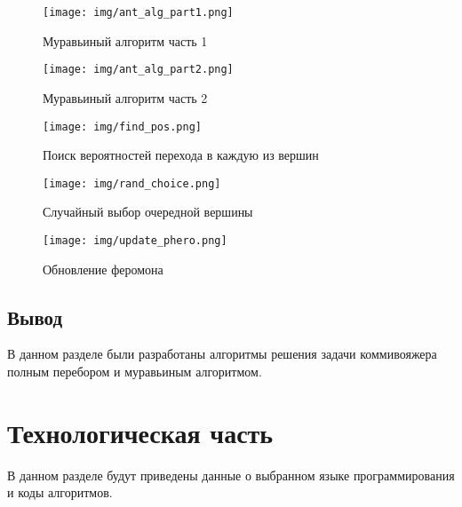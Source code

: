 \documentclass{bmstu}
\begin{document}
\clearpage

\begin{figure}[h]
	\centering
        \vspace{0pt}
	\texttt{[image: img/ant\_alg\_part1.png]}
	\caption{Муравьиный алгоритм часть 1}
        \vspace*{3in}
	\label{fig:aa1}
\end{figure}
\clearpage
\begin{figure}[h]
	\centering
        \vspace{0pt}
	\texttt{[image: img/ant\_alg\_part2.png]}
	\caption{Муравьиный алгоритм часть 2}
        \vspace*{3in}
	\label{fig:aa2}
\end{figure}
\clearpage
\begin{figure}[h]
	\centering
        \vspace{0pt}
	\texttt{[image: img/find\_pos.png]}
	\caption{Поиск вероятностей перехода в каждую из вершин}
        \vspace*{3in}
	\label{fig:find_pos}
\end{figure}
\clearpage
\begin{figure}[h]
	\centering
        \vspace{0pt}
	\texttt{[image: img/rand\_choice.png]}
	\caption{Случайный выбор очередной вершины}
        \vspace*{3in}
	\label{fig:rand_choice}
\end{figure}
\clearpage
\begin{figure}[h]
	\centering
        \vspace{0pt}
	\texttt{[image: img/update\_phero.png]}
	\caption{Обновление феромона}
        \vspace*{3in}
	\label{fig:update_phero}
\end{figure}
\clearpage

\section*{Вывод}
В данном разделе были разработаны алгоритмы решения задачи коммивояжера полным перебором и муравьиным алгоритмом.

\clearpage

\chapter{Технологическая часть}

В данном разделе будут приведены данные о выбранном языке программирования и коды алгоритмов.
\end{document}
